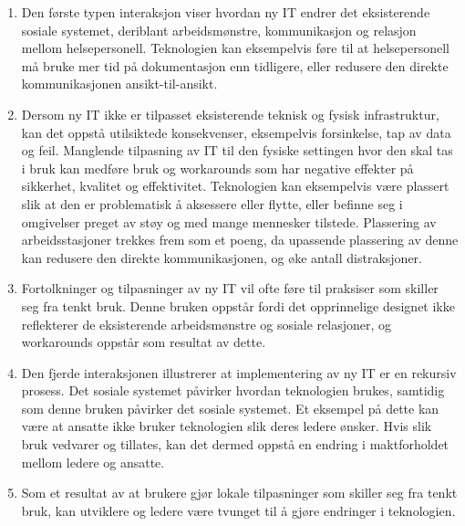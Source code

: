 \begin{enumerate}
\item Den første typen interaksjon viser hvordan ny IT endrer det eksisterende sosiale systemet, deriblant arbeidsmønstre, kommunikasjon og relasjon mellom helsepersonell. Teknologien kan eksempelvis føre til at helsepersonell må bruke mer tid på dokumentasjon enn tidligere, eller redusere den direkte kommunikasjonen ansikt-til-ansikt.
\item Dersom ny IT ikke er tilpasset eksisterende teknisk og fysisk infrastruktur, kan det oppstå utilsiktede konsekvenser, eksempelvis forsinkelse, tap av data og feil. Manglende tilpasning av IT til den fysiske settingen hvor den skal tas i bruk kan medføre bruk og workarounds som har negative effekter på sikkerhet, kvalitet og effektivitet. Teknologien kan eksempelvis være plassert slik at den er problematisk å aksessere eller flytte, eller befinne seg i omgivelser preget av støy og med mange mennesker tilstede. Plassering av arbeidsstasjoner trekkes frem som et poeng, da upassende plassering av denne kan redusere den direkte kommunikasjonen, og øke antall distraksjoner. 
\item Fortolkninger og tilpasninger av ny IT vil ofte føre til praksiser som skiller seg fra tenkt bruk. Denne bruken oppstår fordi det opprinnelige designet ikke reflekterer de eksisterende arbeidsmønstre og sosiale relasjoner, og workarounds oppstår som resultat av dette.
\item Den fjerde interaksjonen illustrerer at implementering av ny IT er en rekursiv prosess. Det sosiale systemet påvirker hvordan teknologien brukes, samtidig som denne bruken påvirker det sosiale systemet. Et eksempel på dette kan være at ansatte ikke bruker teknologien slik deres ledere ønsker. Hvis slik bruk vedvarer og tillates, kan det dermed oppstå en endring i maktforholdet mellom ledere og ansatte.  
\item Som et resultat av at brukere gjør lokale tilpasninger som skiller seg fra tenkt bruk, kan utviklere og ledere være tvunget til å gjøre endringer i teknologien.
\end{enumerate}


